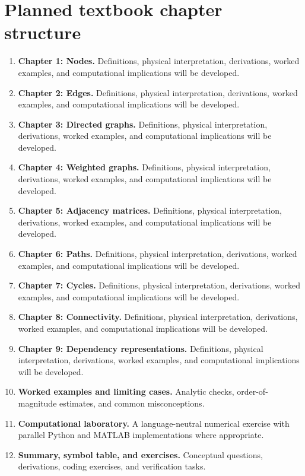 \documentclass[11pt]{article}
\begin{document}
\section{Planned textbook chapter structure}
\begin{enumerate}[leftmargin=1.8em]
\item \textbf{Chapter 1: Nodes.} Definitions, physical interpretation, derivations, worked examples, and computational implications will be developed.
\item \textbf{Chapter 2: Edges.} Definitions, physical interpretation, derivations, worked examples, and computational implications will be developed.
\item \textbf{Chapter 3: Directed graphs.} Definitions, physical interpretation, derivations, worked examples, and computational implications will be developed.
\item \textbf{Chapter 4: Weighted graphs.} Definitions, physical interpretation, derivations, worked examples, and computational implications will be developed.
\item \textbf{Chapter 5: Adjacency matrices.} Definitions, physical interpretation, derivations, worked examples, and computational implications will be developed.
\item \textbf{Chapter 6: Paths.} Definitions, physical interpretation, derivations, worked examples, and computational implications will be developed.
\item \textbf{Chapter 7: Cycles.} Definitions, physical interpretation, derivations, worked examples, and computational implications will be developed.
\item \textbf{Chapter 8: Connectivity.} Definitions, physical interpretation, derivations, worked examples, and computational implications will be developed.
\item \textbf{Chapter 9: Dependency representations.} Definitions, physical interpretation, derivations, worked examples, and computational implications will be developed.
\item \textbf{Worked examples and limiting cases.} Analytic checks, order-of-magnitude estimates, and common misconceptions.
\item \textbf{Computational laboratory.} A language-neutral numerical exercise with parallel Python and MATLAB implementations where appropriate.
\item \textbf{Summary, symbol table, and exercises.} Conceptual questions, derivations, coding exercises, and verification tasks.
\end{enumerate}
\end{document}

